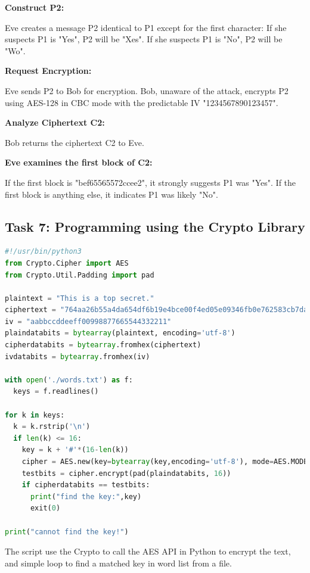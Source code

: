 \documentclass[a4paper]{article}
\begin{document}
\begin{itemize}
\textbf{Construct P2:}

Eve creates a message P2 identical to P1 except for the first character:
If she suspects P1 is "Yes", P2 will be "Xes".
If she suspects P1 is "No", P2 will be "Wo".

\textbf{Request Encryption:}

Eve sends P2 to Bob for encryption.
Bob, unaware of the attack, encrypts P2 using AES-128 in CBC mode with the predictable IV "1234567890123457".

\textbf{Analyze Ciphertext C2:}

Bob returns the ciphertext C2 to Eve.

\textbf{Eve examines the first block of C2:}

If the first block is "bef65565572ccee2", it strongly suggests P1 was "Yes".
If the first block is anything else, it indicates P1 was likely "No".

\end{itemize}

\subsection{Task 7: Programming using the Crypto Library}

\begin{lstlisting}[caption={find key script in Python},label={lst:task2.7},language=PYTHON,breaklines=true]
#!/usr/bin/python3
from Crypto.Cipher import AES
from Crypto.Util.Padding import pad

plaintext = "This is a top secret."
ciphertext = "764aa26b55a4da654df6b19e4bce00f4ed05e09346fb0e762583cb7da2ac93a2"
iv = "aabbccddeeff00998877665544332211"
plaindatabits = bytearray(plaintext, encoding='utf-8')
cipherdatabits = bytearray.fromhex(ciphertext)
ivdatabits = bytearray.fromhex(iv)

with open('./words.txt') as f:
  keys = f.readlines()

for k in keys:
  k = k.rstrip('\n')
  if len(k) <= 16:
    key = k + '#'*(16-len(k))
    cipher = AES.new(key=bytearray(key,encoding='utf-8'), mode=AES.MODE_CBC, iv=ivdatabits)
    testbits = cipher.encrypt(pad(plaindatabits, 16))
    if cipherdatabits == testbits:
      print("find the key:",key)
      exit(0)

print("cannot find the key!")
\end{lstlisting} 

The script use the Crypto to call the AES API in Python to encrypt the text, and simple loop to find a matched key in word list from a file.
\end{document}
